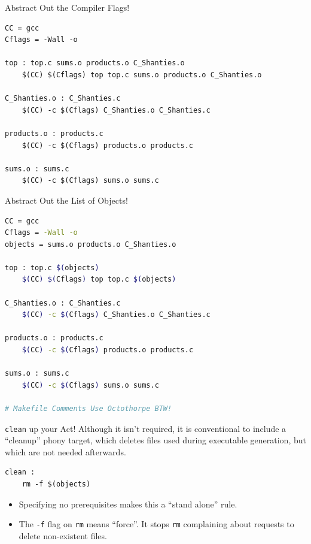 \documentclass[11pt]{beamer}
\begin{document}
\begin{frame}[fragile=singleslide]{Abstract Out the Compiler Flags!}
\begin{lstlisting}[style=terminal]
CC = gcc
Cflags = -Wall -o 

top : top.c sums.o products.o C_Shanties.o 
	$(CC) $(Cflags) top top.c sums.o products.o C_Shanties.o

C_Shanties.o : C_Shanties.c
	$(CC) -c $(Cflags) C_Shanties.o C_Shanties.c

products.o : products.c
	$(CC) -c $(Cflags) products.o products.c

sums.o : sums.c
	$(CC) -c $(Cflags) sums.o sums.c
\end{lstlisting}
\end{frame}

\begin{frame}[fragile=singleslide]{Abstract Out the List of Objects!}
\begin{lstlisting}[style=terminal, language=bash]
CC = gcc
Cflags = -Wall -o 
objects = sums.o products.o C_Shanties.o 

top : top.c $(objects)
	$(CC) $(Cflags) top top.c $(objects)

C_Shanties.o : C_Shanties.c
	$(CC) -c $(Cflags) C_Shanties.o C_Shanties.c

products.o : products.c
	$(CC) -c $(Cflags) products.o products.c

sums.o : sums.c
	$(CC) -c $(Cflags) sums.o sums.c
	
# Makefile Comments Use Octothorpe BTW!
\end{lstlisting}
\end{frame}

\begin{frame}[fragile=singleslide]{\texttt{clean} up your Act!}
Although it isn't required, it is conventional to include a ``cleanup'' phony target, which deletes files used during executable generation, but which are not needed afterwards.  
\begin{lstlisting}[style=terminal]
clean : 
	rm -f $(objects)
\end{lstlisting}
\begin{itemize}
\item Specifying no prerequisites makes this a ``stand alone'' rule.
\item The \texttt{-f} flag on \texttt{rm} means ``force''.  It stops \texttt{rm} complaining about requests to delete non-existent files.
\end{itemize}
\end{frame}
\end{document}
